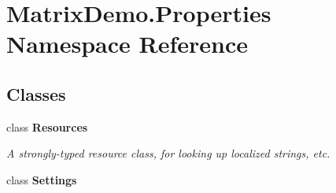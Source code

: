 \hypertarget{namespace_matrix_demo_1_1_properties}{}\section{Matrix\+Demo.\+Properties Namespace Reference}
\label{namespace_matrix_demo_1_1_properties}
\subsection*{Classes}
\begin{DoxyCompactItemize}
\item 
class {\bfseries Resources}
\begin{DoxyCompactList}\small\item\em A strongly-\/typed resource class, for looking up localized strings, etc. \end{DoxyCompactList}\item 
class {\bfseries Settings}
\end{DoxyCompactItemize}
